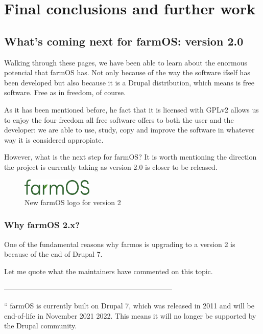\chapter{Final conclusions and further work}\label{cap:conclusiones}

\section{What's coming next for farmOS: version 2.0}
Walking through these pages, we have been able to learn about the enormous potencial that farmOS has. Not only because of the way the software ifself has been developed but also because it is a Drupal distribution, which means is free software. Free as in freedom, of course.

As it has been mentioned before, he fact that it is licensed with GPLv2 allows us to enjoy the four freedom all free software offers to both the user and the developer: we are able to use, study, copy and improve the software in whatever way it is considered appropiate.

However, what is the next step for farmOS? It is worth mentioning the direction the project is currently taking as version 2.0 is closer to be released.

\vspace{3mm}

\begin{figure}[H]
    \centering
    \includegraphics[width=0.3\textwidth]{fig/new-farmos.png}
    \caption{New farmOS logo for version 2}
    \label{fig:new-farmos}
\end{figure}

\vspace{3mm}

\subsection{Why farmOS 2.x?}
One of the fundamental reasons why farmos is upgrading to a version 2 is because of the end of Drupal 7.

Let me quote what the maintainers have commented on this topic\cite{end-of-d7}.

\vspace{3mm}
-----------------------------------------------------------------------

`` farmOS is currently built on Drupal 7, which was released in 2011 and will be end-of-life in November 2021 2022. This means it will no longer be supported by the Drupal community.

